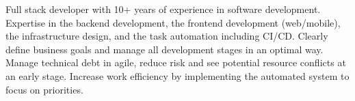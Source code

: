 

\begin{cvparagraph}





Full stack developer with 10+ years of experience in software development.
Expertise in the backend development, the frontend development (web/mobile), the infrastructure design, and the task automation including CI/CD.
Clearly define business goals and manage all development stages in an optimal way.
Manage technical debt in agile, reduce risk and see potential resource conflicts at an early stage.
Increase work efficiency by implementing the automated system to focus on priorities.

\end{cvparagraph}
